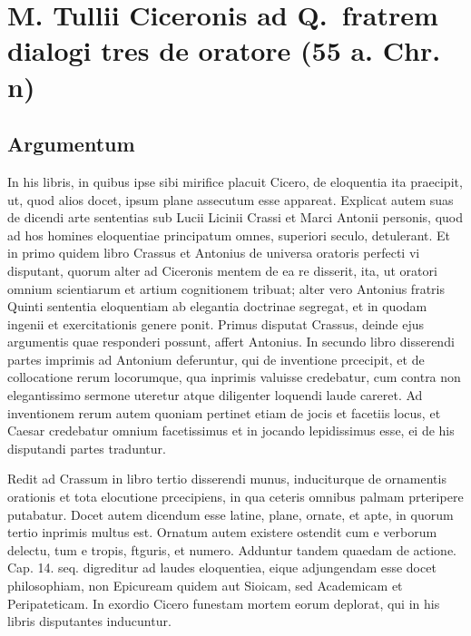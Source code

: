 
\section*{M. Tullii Ciceronis ad Q.\ fratrem \\dialogi tres de oratore (55 a. Chr. n)}

\subsection*{Argumentum}

In his libris, in quibus ipse sibi mirifice placuit Cicero, de eloquentia ita praecipit, ut, quod alios docet, ipsum plane assecutum esse appareat. Explicat autem suas de dicendi arte sententias sub Lucii Licinii Crassi et Marci Antonii personis, quod ad hos homines eloquentiae principatum omnes, superiori seculo, detulerant. Et in primo quidem libro Crassus et Antonius de universa oratoris perfecti vi disputant, quorum alter ad Ciceronis mentem de ea re disserit, ita, ut oratori omnium scientiarum et artium cognitionem tribuat; alter vero Antonius fratris Quinti sententia eloquentiam ab elegantia doctrinae segregat, et in quodam ingenii et exercitationis genere ponit. Primus disputat Crassus, deinde ejus argumentis quae responderi possunt, affert Antonius. In secundo libro disserendi partes imprimis ad Antonium deferuntur, qui de inventione prcecipit, et de collocatione rerum locorumque, qua inprimis valuisse credebatur, cum contra non elegantissimo sermone uteretur atque diligenter loquendi laude careret. Ad inventionem rerum autem quoniam pertinet etiam de jocis et facetiis locus, et Caesar credebatur omnium facetissimus et in jocando lepidissimus esse, ei de his disputandi partes traduntur.

Redit ad Crassum in libro tertio disserendi munus, induciturque de ornamentis orationis et tota elocutione prcecipiens, in qua ceteris omnibus palmam prteripere putabatur. Docet autem dicendum esse latine, plane, ornate, et apte, in quorum tertio inprimis multus est. Ornatum autem existere ostendit cum e verborum delectu, tum e tropis, ftguris, et numero. Adduntur tandem quaedam de actione. Cap. 14. seq. digreditur ad laudes eloquentiea, eique adjungendam esse docet philosophiam, non Epicuream quidem aut Sioicam, sed Academicam et Peripateticam. In exordio Cicero funestam mortem eorum deplorat, qui in his libris disputantes inducuntur.


